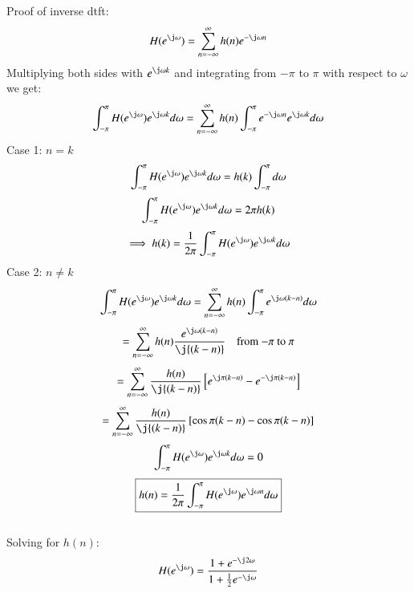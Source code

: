 \documentclass[journal,12pt,twocolumn]{IEEEtran}
\begin{document}
\solution
Proof of inverse dtft:
\begin{equation}
		H(e^{\j\omega}) = \sum_{n=-\infty}^{\infty}h(n)e^{-\j\omega{n}}
\end{equation}
Multiplying both sides with $e^{\j\omega{k}}$ and integrating from $-\pi$ to $\pi$ with respect to $\omega$ we get:
\begin{equation}
	\int_{-\pi}^{\pi}H(e^{\j\omega})e^{\j\omega{k}}d\omega = \sum_{n=-\infty}^{\infty}h(n)\int_{-\pi}^{\pi}e^{-\j\omega{n}}e^{\j\omega{k}}d\omega
\end{equation}
Case 1: $n = k$
\begin{equation}
	\int_{-\pi}^{\pi}H(e^{\j\omega})e^{\j\omega{k}}d\omega = h(k)\int_{-\pi}^{\pi}d\omega
\end{equation}
\begin{equation}
	\int_{-\pi}^{\pi}H(e^{\j\omega})e^{\j\omega{k}}d\omega = 2\pi{h(k)}
\end{equation}
\begin{equation}
	\implies h(k) = \frac{1}{2\pi}\int_{-\pi}^{\pi}H(e^{\j\omega})e^{\j\omega{k}}d\omega
\end{equation}
Case 2: $n \neq k$
\begin{equation}
	\int_{-\pi}^{\pi}H(e^{\j\omega})e^{\j\omega{k}}d\omega = \sum_{n=-\infty}^{\infty}h(n)\int_{-\pi}^{\pi}e^{\j\omega{(k-n)}}d\omega
\end{equation}
\begin{align}
	= \sum_{n=-\infty}^{\infty}h(n)\frac{e^{\j\omega{(k-n)}}}{\j{(k-n)}} \quad \text{from $-\pi$ to $\pi$}
\end{align}
\begin{align}
	= \sum_{n=-\infty}^{\infty}\frac{h(n)}{\j{(k-n)}}\left[e^{\j\pi{(k-n)}} - e^{-\j\pi{(k-n)}}\right]
\end{align}
\begin{align}
	= \sum_{n=-\infty}^{\infty}\frac{h(n)}{\j{(k-n)}}\left[\cos\pi{(k-n)} - \cos\pi{(k-n)}\right]
\end{align}
\begin{align}
	\int_{-\pi}^{\pi}H(e^{\j\omega})e^{\j\omega{k}}d\omega = 0
\end{align}
\begin{equation}
	\boxed{h(n) = \frac{1}{2\pi}\int_{-\pi}^{\pi}H(e^{\j\omega})e^{\j\omega{n}}d\omega}
\end{equation}
\\Solving for $h(n)$:
\begin{equation}
	H(e^{\j\omega}) = \frac{1 + e^{-\j2\omega}}{1 + \frac{1}{2}e^{-\j\omega}}
\end{equation}
\end{document}
